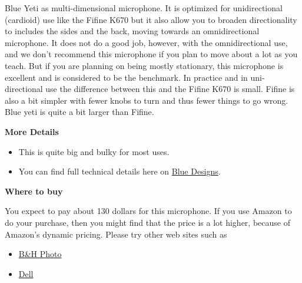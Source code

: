 \begin{gram}
\label{grm:equipment::blueyeti::main}
%
Blue Yeti as multi-dimensional microphone.
%
It is optimized for unidirectional (cardioid) use like the Fifine K670
but it also allow you to broaden directionality to includes the sides
and the back, moving towards an omnidirectional microphone.
%
It does not do a good job, however, with the omnidirectional use, and we don't recommend this microphone if you plan to move about a lot as you teach.
%
But if you are planning on being mostly stationary, this microphone is excellent and is considered to be the benchmark.
%
In practice and in uni-directional use the difference between this and
the Fifine K670 is small.  Fifine is also a bit simpler with fewer knobs to turn and thus fewer things to go wrong.  Blue yeti is quite a bit larger than Fifine.


\textbf{More Details}

\begin{itemize}
\item This is quite big and bulky for most uses. 
\item 
You can find full technical details here on \href{https://www.bluedesigns.com/products/yeti/}{Blue Designs}.
\end{itemize}

\textbf{Where to buy}

You expect to pay about 130 dollars for this microphone.  If you use Amazon to do your purchase, then you might find that the price is a lot higher, because of Amazon's dynamic pricing.  Please try other web sites such as 

\begin{itemize}
\item
\href{https://www.bhphotovideo.com/c/product/1252288-REG/blue_yeti_whiteout_yeti_usb_microphone_whiteout.html/?ap=y&ap=y&smp=y&smp=y&lsft=BI%3A514&gclid=CjwKCAjwgdX4BRB_EiwAg8O8HaL477lNngiVZfES7WLhUcJSUUvOZpExsDJj6nonuKow3CfyNGzRqRoC-dAQAvD_BwE}{B\&H Photo}
\item 
\href{https://www.dell.com/en-us/shop/blue-microphones-yeti-microphone-usb-aztec-copper/apd/aa829519?gacd=9614064-1012-5761040-0-0&dgc=st&gclid=CjwKCAjwgdX4BRB_EiwAg8O8HUjMAfBK6gO_-L-fdNSOjOlY2YqmqpLKR2qxP7hb-yRx8xlw1bscKBoCk0wQAvD_BwE&gclsrc=aw.ds}{Dell}
\end{itemize}
\end{gram}

\begin{gram}
\end{gram}

